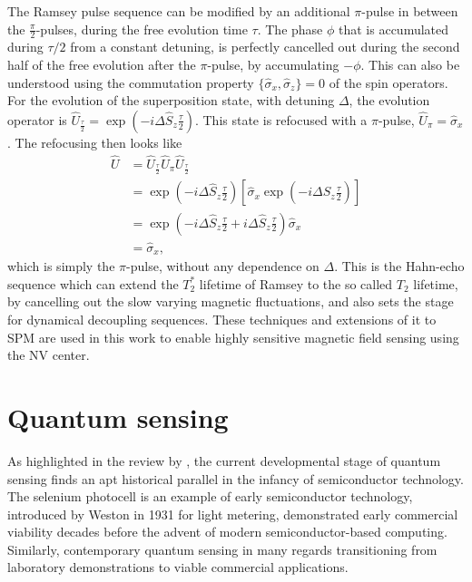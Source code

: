 The Ramsey pulse sequence can be modified by an additional $\pi$-pulse in between the $\frac{\pi}{2}$-pulses, during the free evolution time $\tau$. The phase $\phi$ that is accumulated during $\tau/2$ from a constant detuning, is perfectly cancelled out during the second half of the free evolution after the $\pi$-pulse, by accumulating $-\phi$. This can also be understood using the commutation property $\{\hat{\sigma}_x, \hat{\sigma}_z\} = 0$ of the spin operators. For the evolution of the superposition state, with detuning $\Delta$, the evolution operator is 
$\hat{U}_{\frac{\tau}{2}} = \exp\left (-i\Delta \hat{S}_z \frac{\tau}{2}\right )$. This state is refocused with a $\pi$-pulse, $\hat{U}_\pi = \hat{\sigma}_x$. The refocusing then looks like
\begin{equation}
    \begin{split}
        \hat{U} &= \hat{U}_{\frac{\tau}{2}} \hat{U}_{\pi} \hat{U}_{\frac{\tau}{2}} \\
        &= \exp \left( -i\Delta \hat{S}_z \frac{\tau}{2} \right) \left[ \hat{\sigma}_x \exp \left( -i\Delta \hat{S}_z \frac{\tau}{2} \right) \right] \\
        &= \exp \left( -i\Delta \hat{S}_z \frac{\tau}{2} + i\Delta \hat{S}_z \frac{\tau}{2} \right) \hat{\sigma}_x \\
        &= \hat{\sigma}_x,
    \end{split}
\end{equation}
which is simply the $\pi$-pulse, without any dependence on $\Delta$. This is the Hahn-echo sequence which can extend the $T_2^*$ lifetime of Ramsey to the so called $T_2$ lifetime, by cancelling out the slow varying magnetic fluctuations, and also sets the stage for dynamical decoupling sequences\cite{barrySensitivityOptimizationNVdiamond2020}. These techniques and extensions of it to \gls{SPM} are used in this work to enable highly sensitive magnetic field sensing using the \gls{NV} center.

\section{Quantum sensing}
As highlighted in the review by \citeauthor*{degenQuantumSensing2017}, the current developmental stage of quantum sensing finds an apt historical parallel in the infancy of semiconductor technology. The selenium photocell is an example of early semiconductor technology, introduced by Weston in 1931\cite{westonExposureMeter1935} for light metering, demonstrated early commercial viability decades before the advent of modern semiconductor-based computing. Similarly, contemporary quantum sensing in many regards transitioning from laboratory demonstrations to viable commercial applications.

